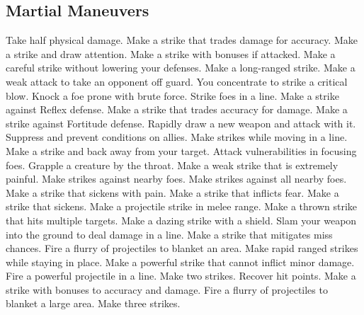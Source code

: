 \small
\subsection{Martial Maneuvers}\label{Martial Maneuvers}
\begin{spelllist}
 Take half physical damage.
 Make a strike that trades damage for accuracy.
 Make a strike and draw attention.
 Make a strike with bonuses if attacked.
 Make a careful strike without lowering your defenses.
 Make a long-ranged strike.
 Make a weak attack to take an opponent off guard.
 You concentrate to strike a critical blow.
 Knock a foe prone with brute force.
 Strike foes in a line.
 Make a strike against Reflex defense.
 Make a strike that trades accuracy for damage.
 Make a strike against Fortitude defense.
 Rapidly draw a new weapon and attack with it.
 Suppress and prevent conditions on allies.
 Make strikes while moving in a line.
 Make a strike and back away from your target.
 Attack vulnerabilities in focusing foes.
 Grapple a creature by the throat.
 Make a weak strike that is extremely painful.
 Make strikes against nearby foes.
 Make strikes against all nearby foes.
 Make a strike that sickens with pain.
 Make a strike that inflicts fear.
 Make a strike that sickens.
 Make a projectile strike in melee range.
 Make a thrown strike that hits multiple targets.
 Make a dazing strike with a shield.
 Slam your weapon into the ground to deal damage in a line.
 Make a strike that mitigates miss chances.
 Fire a flurry of projectiles to blanket an area.
 Make rapid ranged strikes while staying in place.
 Make a powerful strike that cannot inflict minor damage.
 Fire a powerful projectile in a line.
 Make two strikes.
 Recover hit points.
 Make a strike with bonuses to accuracy and damage.
 Fire a flurry of projectiles to blanket a large area.
 Make three strikes.
\end{spelllist}



